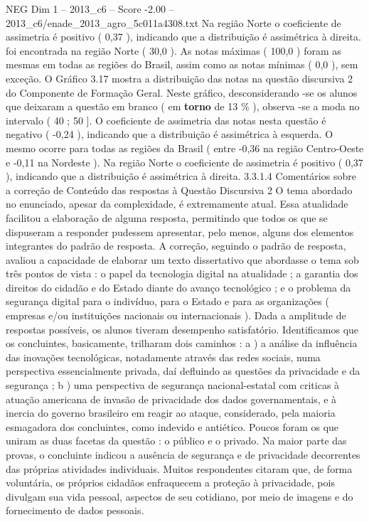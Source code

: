 \begin{textsample}{NEG Dim 1 – 2013\_c6 – Score -2.00 – 2013\_c6/enade\_2013\_agro\_5c011a4308.txt}
Na região Norte o coeficiente de assimetria é positivo ( 0,37 ), indicando que a distribuição é assimétrica à direita. foi encontrada na região Norte ( 30,0 ).
As notas máximas ( 100,0 ) foram as mesmas em todas as regiões do Brasil, assim como as notas mínimas ( 0,0 ), sem exceção.
O Gráfico 3.17 mostra a distribuição das notas na questão discursiva 2 do Componente de Formação Geral.
Neste gráfico, desconsiderando -se os alunos que deixaram a questão em branco ( em \textbf{torno} de 13 \% ), observa -se a moda no intervalo ( 40 ; 50 ].
O coeficiente de assimetria das notas nesta questão é negativo ( -0,24 ), indicando que a distribuição é assimétrica à esquerda.
O mesmo ocorre para todas as regiões da Brasil ( entre -0,36 na região Centro-Oeste e -0,11 na Nordeste ).
Na região Norte o coeficiente de assimetria é positivo ( 0,37 ), indicando que a distribuição é assimétrica à direita. 3.3.1.4 Comentários sobre a correção de Conteúdo das respostas à Questão Discursiva 2 O tema abordado no enunciado, apesar da complexidade, é extremamente atual.
Essa atualidade facilitou a elaboração de alguma resposta, permitindo que todos os que se dispuseram a responder pudessem apresentar, pelo menos, alguns dos elementos integrantes do padrão de resposta.
A correção, seguindo o padrão de resposta, avaliou a capacidade de elaborar um texto dissertativo que abordasse o tema sob três pontos de vista : o papel da tecnologia digital na atualidade ; a garantia dos direitos do cidadão e do Estado diante do avanço tecnológico ; e o problema da segurança digital para o indivíduo, para o Estado e para as organizações ( empresas e/ou instituições nacionais ou internacionais ).
Dada a amplitude de respostas possíveis, os alunos tiveram desempenho satisfatório.
Identificamos que os concluintes, basicamente, trilharam dois caminhos : a ) a análise da influência das inovações tecnológicas, notadamente através das redes sociais, numa perspectiva essencialmente privada, daí defluindo as questões da privacidade e da segurança ; b ) uma perspectiva de segurança nacional-estatal com criticas à atuação americana de invasão de privacidade dos dados governamentais, e à inercia do governo brasileiro em reagir ao ataque, considerado, pela maioria esmagadora dos concluintes, como indevido e antiético.
Poucos foram os que uniram as duas facetas da questão : o público e o privado.
Na maior parte das provas, o concluinte indicou a ausência de segurança e de privacidade decorrentes das próprias atividades individuais.
Muitos respondentes citaram que, de forma voluntária, os próprios cidadãos enfraquecem a proteção à privacidade, pois divulgam sua vida pessoal, aspectos de seu cotidiano, por meio de imagens e do fornecimento de dados pessoais.

\end{textsample}
